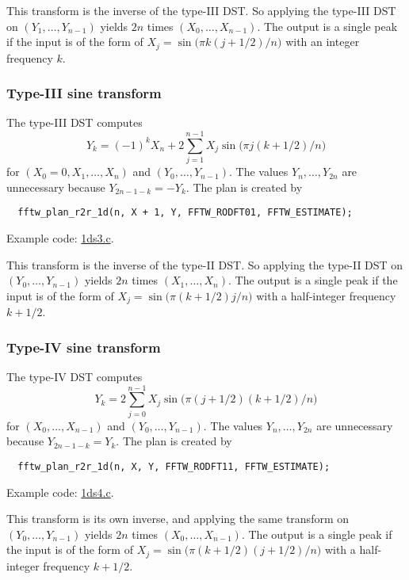 \documentclass[12pt]{article}
\begin{document}
This transform is the inverse of the type-III DST.
%
So applying the type-III DST on $(Y_1, \dots, Y_{n-1})$
  yields $2n$ times $(X_0, \dots, X_{n-1})$.
The output is a single peak if the input is of the form of
  $X_j = \sin\big(\pi k (j + 1/2) / n \big)$
  with an integer frequency $k$.





\subsubsection{Type-III sine transform}
The type-III DST computes
\begin{equation}
  Y_k = (-1)^k X_n
    + 2 \sum_{j = 1}^{n - 1} X_j \sin\big( \pi j (k + 1/2) / n \big)
\end{equation}
%
for $(X_0 = 0, X_1, \dots, X_{n})$ and $(Y_0, \dots, Y_{n-1})$.
%
The values $Y_{n}, \dots, Y_{2n}$ are unnecessary because
$Y_{2n - 1 - k} = -Y_k$.
%
The plan is created by
\begin{verbatim}
  fftw_plan_r2r_1d(n, X + 1, Y, FFTW_RODFT01, FFTW_ESTIMATE);
\end{verbatim}
Example code: \url{1ds3.c}.


This transform is the inverse of the type-II DST.
%
So applying the type-II DST on $(Y_0, \dots, Y_{n-1})$
  yields $2n$ times $(X_1, \dots, X_{n})$.
The output is a single peak if the input is of the form of
  $X_j = \sin\big(\pi (k + 1/2) j / n \big)$
  with a half-integer frequency $k + 1/2$.





\subsubsection{Type-IV sine transform}
The type-IV DST computes
\begin{equation}
  Y_k = 2 \sum_{j = 0}^{n - 1} X_j \sin\big( \pi (j + 1/2) (k + 1/2) / n \big)
\end{equation}
%
for $(X_0, \dots, X_{n - 1})$ and $(Y_0, \dots, Y_{n-1})$.
%
The values $Y_{n}, \dots, Y_{2n}$ are unnecessary because
$Y_{2n - 1 - k} = Y_k$.
%
The plan is created by
\begin{verbatim}
  fftw_plan_r2r_1d(n, X, Y, FFTW_RODFT11, FFTW_ESTIMATE);
\end{verbatim}
Example code: \url{1ds4.c}.


This transform is its own inverse,
%
and applying the same transform on $(Y_0, \dots, Y_{n-1})$
  yields $2n$ times $(X_0, \dots, X_{n - 1})$.
The output is a single peak if the input is of the form of
  $X_j = \sin\big(\pi (k + 1/2) (j + 1/2) / n \big)$
  with a half-integer frequency $k + 1/2$.
\end{document}
